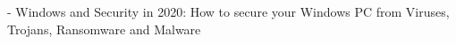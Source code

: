 - Windows and Security in 2020: How to secure your Windows PC from Viruses, Trojans, Ransomware and Malware \\

